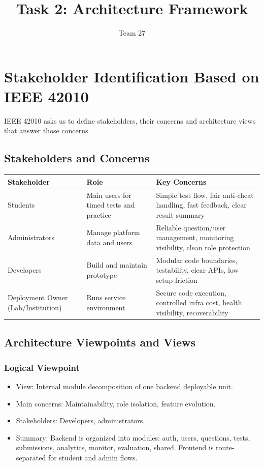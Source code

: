 \documentclass[12pt,journal,onecolumn]{IEEEtran}
\begin{document}
\title{Task 2: Architecture Framework}
\author{Team 27}
\maketitle

\section{Stakeholder Identification Based on IEEE 42010}

IEEE 42010 asks us to define stakeholders, their concerns and architecture views that answer those concerns.

\subsection{Stakeholders and Concerns}

\begin{longtable}{|p{3cm}|p{3cm}|p{8cm}|}
\hline
\textbf{Stakeholder} & \textbf{Role} & \textbf{Key Concerns} \\
\hline
Students & Main users for timed tests and practice & Simple test flow, fair anti-cheat handling, fast feedback, clear result summary \\
\hline
Administrators & Manage platform data and users & Reliable question/user management, monitoring visibility, clean role protection \\
\hline
Developers & Build and maintain prototype & Modular code boundaries, testability, clear APIs, low setup friction \\
\hline
Deployment Owner (Lab/Institution) & Runs service environment & Secure code execution, controlled infra cost, health visibility, recoverability \\
\hline
\end{longtable}

\subsection{Architecture Viewpoints and Views}

\subsubsection{Logical Viewpoint}
\begin{itemize}
    \item View: Internal module decomposition of one backend deployable unit.
    \item Main concerns: Maintainability, role isolation, feature evolution.
    \item Stakeholders: Developers, administrators.
    \item Summary: Backend is organized into modules: auth, users, questions, tests, submissions, analytics, monitor, evaluation, shared. Frontend is route-separated for student and admin flows.
\end{itemize}
\end{document}
